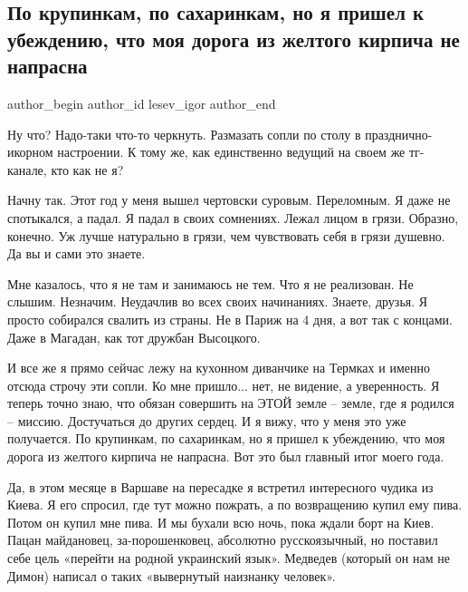  
 
 
 
 
\subsection{По крупинкам, по сахаринкам, но я пришел к убеждению, что моя дорога из желтого кирпича не напрасна}
\label{sec:31_12_2021.tg.lesev_igor.1.moja_doroga}

\ifcmt
 author_begin
   author_id lesev_igor
 author_end
\fi

Ну что? Надо-таки что-то черкнуть. Размазать сопли по столу в
празднично-икорном настроении. К тому же, как единственно ведущий на своем же
тг-канале, кто как не я?

Начну так. Этот год у меня вышел чертовски суровым. Переломным. Я даже не
спотыкался, а падал. Я падал в своих сомнениях. Лежал лицом в грязи. Образно,
конечно. Уж лучше натурально в грязи, чем чувствовать себя в грязи душевно. Да
вы и сами это знаете.

Мне казалось, что я не там и занимаюсь не тем. Что я не реализован. Не слышим.
Незначим. Неудачлив во всех своих начинаниях. Знаете, друзья. Я просто
собирался свалить из страны. Не в Париж на 4 дня, а вот так с концами. Даже в
Магадан, как тот дружбан Высоцкого.

И все же я прямо сейчас лежу на кухонном диванчике на Термках и именно отсюда
строчу эти сопли. Ко мне пришло... нет, не видение, а уверенность. Я теперь точно
знаю, что обязан совершить на ЭТОЙ земле – земле, где я родился – миссию.
Достучаться до других сердец. И я вижу, что у меня это уже получается. По
крупинкам, по сахаринкам, но я пришел к убеждению, что моя дорога из желтого
кирпича не напрасна. Вот это был главный итог моего года.

Да, в этом месяце в Варшаве на пересадке я встретил интересного чудика из
Киева. Я его спросил, где тут можно пожрать, а по возвращению купил ему пива.
Потом он купил мне пива. И мы бухали всю ночь, пока ждали борт на Киев. Пацан
майдановец, за-порошенковец, абсолютно русскоязычный, но поставил себе цель
«перейти на родной украинский язык». Медведев (который он нам не Димон) написал
о таких «вывернутый наизнанку человек».

